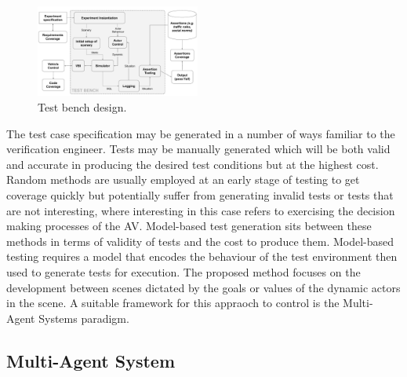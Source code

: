 \documentclass[letterpaper, 10 pt, journal, twoside]{IEEEtran}
\begin{document}
\begin{figure}[!t]
	\centering
\includegraphics[width=0.48\textwidth]{TestBenchMonotone.pdf}
	\caption{Test bench design.}
	\label{testbench}
\end{figure}

%
The test case specification may be generated in a number of ways familiar to the verification engineer. Tests may be manually generated which will be both valid and accurate in producing the desired test conditions but at the highest cost. Random methods are usually employed at an early stage of testing to get coverage quickly but potentially suffer from generating invalid tests or tests that are not interesting, where interesting in this case refers to exercising the decision making processes of the AV. Model-based test generation sits between these methods in terms of validity of tests and the cost to produce them. Model-based testing requires a model that encodes the behaviour of the test environment then used to generate tests for execution.
%
The proposed method focuses on the development between scenes dictated by the goals or values of the dynamic actors in the scene. A suitable framework for this appraoch to control is the Multi-Agent Systems paradigm. 



\subsection{Multi-Agent System}
\end{document}
